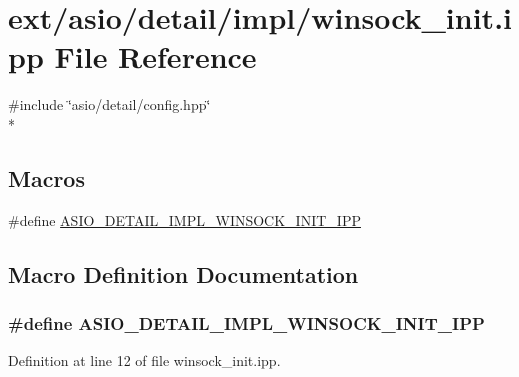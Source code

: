 \hypertarget{winsock__init_8ipp}{}\section{ext/asio/detail/impl/winsock\+\_\+init.ipp File Reference}
\label{winsock__init_8ipp}
{\ttfamily \#include \char`\"{}asio/detail/config.\+hpp\char`\"{}}\\*
\subsection*{Macros}
\begin{DoxyCompactItemize}
\item 
\#define \hyperlink{winsock__init_8ipp_a1d4e45c33ab2040a3b3758c841292e70}{A\+S\+I\+O\+\_\+\+D\+E\+T\+A\+I\+L\+\_\+\+I\+M\+P\+L\+\_\+\+W\+I\+N\+S\+O\+C\+K\+\_\+\+I\+N\+I\+T\+\_\+\+I\+P\+P}
\end{DoxyCompactItemize}


\subsection{Macro Definition Documentation}
\hypertarget{winsock__init_8ipp_a1d4e45c33ab2040a3b3758c841292e70}{}
\subsubsection[{A\+S\+I\+O\+\_\+\+D\+E\+T\+A\+I\+L\+\_\+\+I\+M\+P\+L\+\_\+\+W\+I\+N\+S\+O\+C\+K\+\_\+\+I\+N\+I\+T\+\_\+\+I\+P\+P}]{\setlength{\rightskip}{0pt plus 5cm}\#define A\+S\+I\+O\+\_\+\+D\+E\+T\+A\+I\+L\+\_\+\+I\+M\+P\+L\+\_\+\+W\+I\+N\+S\+O\+C\+K\+\_\+\+I\+N\+I\+T\+\_\+\+I\+P\+P}\label{winsock__init_8ipp_a1d4e45c33ab2040a3b3758c841292e70}


Definition at line 12 of file winsock\+\_\+init.\+ipp.

